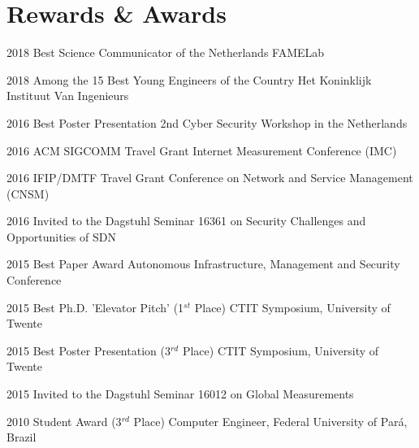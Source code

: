 \documentclass[print]{styles/friggeri-cv-linux} %
\begin{document}
\section{Rewards \& Awards}\vspace{-5pt}

\begin{entrylist}
	
\vspace{-0.3cm}
\entry
{2018}
{Best Science Communicator of the Netherlands}
{FAMELab}

\vspace{-0.3cm}
\entry
{2018}
{Among the 15 Best Young Engineers of the Country}
{Het Koninklijk Instituut Van Ingenieurs}	

\vspace{-0.3cm}
\entry
{2016}
{Best Poster Presentation}
{2nd Cyber Security Workshop in the Netherlands}

\vspace{-0.3cm}
\entry
{2016}
{ACM SIGCOMM Travel Grant}
{Internet Measurement Conference (IMC)}

\vspace{-0.3cm}
\entry
{2016}
{IFIP/DMTF Travel Grant}
{Conference on Network and Service Management (CNSM)}

\vspace{-0.3cm}
\entry
{2016}
{Invited to the Dagstuhl Seminar 16361}
{on Security Challenges and Opportunities of SDN}


\vspace{-0.3cm}
\entry
{2015}
{Best Paper Award}
{Autonomous Infrastructure, Management and Security Conference}

\vspace{-0.3cm}
\entry
{2015}
{Best Ph.D. 'Elevator Pitch' (1$^{st}$ Place)}
{CTIT Symposium, University of Twente}

\vspace{-0.3cm}
\entry
{2015}
{Best Poster Presentation (3$^{rd}$ Place)}
{CTIT Symposium, University of Twente}

\vspace{-0.3cm}
\entry
{2015}
{Invited to the Dagstuhl Seminar 16012}
{on Global Measurements}


\vspace{-0.3cm}
\entry
{2010}
{Student Award (3$^{rd}$ Place)}
{Computer Engineer, Federal University of Pará, Brazil}

\end{entrylist}
\end{document}
